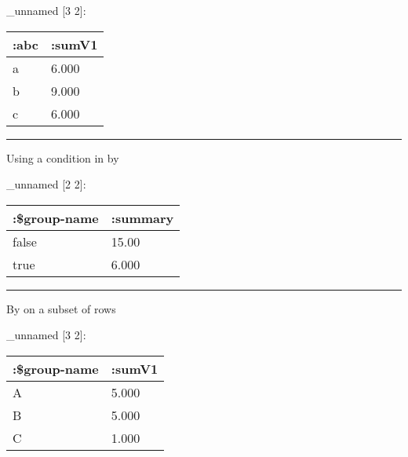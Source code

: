 \documentclass[]{article}
\newenvironment{Shaded}{\begin{snugshade}}{\end{snugshade}}
\newcommand{\KeywordTok}[1]{\textcolor[rgb]{0.13,0.29,0.53}{\textbf{#1}}}
\newcommand{\DecValTok}[1]{\textcolor[rgb]{0.00,0.00,0.81}{#1}}
\newcommand{\StringTok}[1]{\textcolor[rgb]{0.31,0.60,0.02}{#1}}
\newcommand{\VariableTok}[1]{\textcolor[rgb]{0.00,0.00,0.00}{#1}}
\newcommand{\AttributeTok}[1]{\textcolor[rgb]{0.77,0.63,0.00}{#1}}
\newcommand{\NormalTok}[1]{#1}
\begin{document}
\_unnamed {[}3 2{]}:

\begin{longtable}[]{@{}ll@{}}
\toprule
:abc & :sumV1\tabularnewline
\midrule
\endhead
a & 6.000\tabularnewline
b & 9.000\tabularnewline
c & 6.000\tabularnewline
\bottomrule
\end{longtable}

\begin{center}\rule{0.5\linewidth}{0.5pt}\end{center}

Using a condition in by

\begin{Shaded}
\end{Shaded}

\_unnamed {[}2 2{]}:

\begin{longtable}[]{@{}ll@{}}
\toprule
:\$group-name & :summary\tabularnewline
\midrule
\endhead
false & 15.00\tabularnewline
true & 6.000\tabularnewline
\bottomrule
\end{longtable}

\begin{center}\rule{0.5\linewidth}{0.5pt}\end{center}

By on a subset of rows

\begin{Shaded}
\end{Shaded}

\_unnamed {[}3 2{]}:

\begin{longtable}[]{@{}ll@{}}
\toprule
:\$group-name & :sumV1\tabularnewline
\midrule
\endhead
A & 5.000\tabularnewline
B & 5.000\tabularnewline
C & 1.000\tabularnewline
\bottomrule
\end{longtable}
\end{document}
